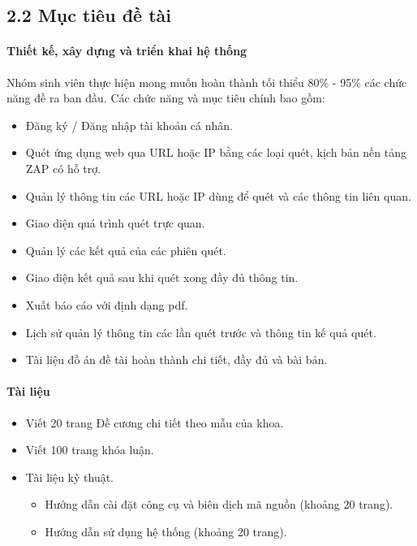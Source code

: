 \subsection*{2.2  Mục tiêu đề tài}
\paragraph{Thiết kế, xây dựng và triển khai hệ thống}
\tab Nhóm sinh viên thực hiện mong muốn hoàn thành tối thiểu 80\% - 95\% các chức năng đề ra ban đầu. Các chức năng và mục tiêu chính bao gồm:
\begin{itemize}
    \item Đăng ký / Đăng nhập tài khoản cá nhân.
    \item Quét ứng dụng web qua URL hoặc IP bằng các loại quét, kịch bản nền tảng ZAP có hỗ trợ.
    \item Quản lý thông tin các URL hoặc IP dùng để quét và các thông tin liên quan.
    \item Giao diện quá trình quét trực quan.
    \item Quản lý các kết quả của các phiên quét.
    \item Giao diện kết quả sau khi quét xong đầy đủ thông tin.
    \item Xuất báo cáo với định dạng pdf.
    \item Lịch sử quản lý thông tin các lần quét trước và thông tin kế quả quét.
    \item Tài liệu đồ án đề tài hoàn thành chi tiết, đầy đủ và bài bản.
\end{itemize}
\paragraph{Tài liệu}
\begin{itemize}
    \item Viết 20 trang Đề cương chi tiết theo mẫu của khoa.
    \item Viết 100 trang khóa luận.
    \item Tài liệu kỹ thuật.
    \begin{itemize}
        \item Hướng dẫn cài đặt công cụ và biên dịch mã nguồn (khoảng 20 trang).
        \item Hướng dẫn sử dụng hệ thống (khoảng 20 trang).
    \end{itemize}
\end{itemize}